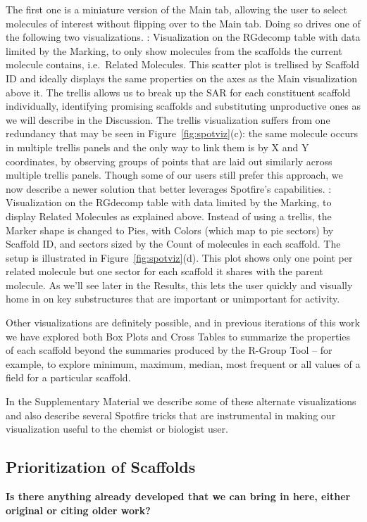 \documentclass[journal=jacsat,manuscript=article]{achemso}
\newcommand*\fref[1]{Figure~\ref{fig:#1}}
\newcommand*\ie{i.e.~}
\begin{document}
\begin{itemize}
\subitem The first one is a miniature version of the Main tab, allowing the user to select molecules of interest without flipping over to the Main tab. Doing so drives one of the following two visualizations.
: Visualization on the {RG}decomp table with data limited by the Marking, to only show molecules from the scaffolds the current molecule contains, \ie Related Molecules.  This scatter plot is trellised by Scaffold ID and ideally displays the same properties on the axes as the Main visualization above it.  The trellis allows us to break up the SAR for each constituent scaffold individually, identifying promising scaffolds and substituting unproductive ones as we will describe in the Discussion. The trellis visualization suffers from one redundancy that may be seen in \fref{spotviz}(c): the same molecule occurs in multiple trellis panels and the only way to link them is by X and Y coordinates, by observing groups of points that are laid out similarly across multiple trellis panels.  Though some of our users still prefer this approach, we now describe a newer solution that better leverages Spotfire's capabilities. 
: Visualization on the {RG}decomp table with data limited by the Marking, to display Related Molecules as explained above. Instead of using a trellis, the Marker shape is changed to Pies, with Colors (which map to pie sectors) by Scaffold ID, and sectors sized by the Count of molecules in each scaffold.  The setup is illustrated in \fref{spotviz}(d). This plot shows only one point per related molecule but one sector for each scaffold it shares with the parent molecule.  As we'll see later in the Results, this lets the user quickly and visually home in on key substructures that are important or unimportant for activity. 
\end{itemize}

Other visualizations are definitely possible, and in previous iterations of this work we have explored both Box Plots and Cross Tables to summarize the properties of each scaffold beyond the summaries produced by the R-Group Tool -- for example, to explore minimum, maximum, median, most frequent or all values of a field for a particular scaffold.  

In the Supplementary Material we describe some of these alternate visualizations and also describe several Spotfire tricks that are instrumental in making our visualization useful to the chemist or biologist user. 

\subsection{Prioritization of Scaffolds} 
\label{sec:scafprio}
\textbf{Is there anything already developed that we can bring in here, either original or citing older work?}
\end{document}
